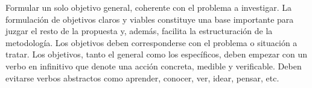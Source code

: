 \documentclass[../Main.tex]{subfiles}
\begin{document}
Formular un solo objetivo general, coherente con el problema a investigar. La formulación de
objetivos claros y viables constituye una base importante para juzgar el resto de la propuesta y,
además, facilita la estructuración de la metodología. Los objetivos deben corresponderse con el
problema o situación a tratar. Los objetivos, tanto el general como los específicos, deben empezar
con un verbo en infinitivo que denote una acción concreta, medible y verificable. Deben evitarse
verbos abstractos como aprender, conocer, ver, idear, pensar, etc.
\end{document}
